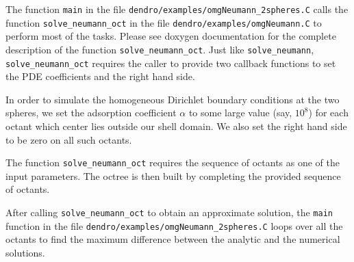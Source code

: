 \documentclass[12pt,reqno,a4paper]{report}
\numberwithin{equation}{section}
\begin{document}
The function \lstinline[basicstyle=\bfseries]'main' in the file \verb'dendro/examples/omgNeumann_2spheres.C' calls the function \lstinline[basicstyle=\bfseries]'solve_neumann_oct' in the file  \verb'dendro/examples/omgNeumann.C' to perform most of the tasks. Please see doxygen documentation for the complete description of the function \lstinline[basicstyle=\bfseries]'solve_neumann_oct'. 
Just like \lstinline[basicstyle=\bfseries]'solve_neumann', \lstinline[basicstyle=\bfseries]'solve_neumann_oct' requires the caller to provide two callback functions to set the  PDE coefficients and the right hand side. 

In order to simulate the homogeneous Dirichlet boundary conditions at the two spheres, we set the adsorption coefficient $\alpha$ to some large value (say, $10^8$) for each octant which center lies outside our shell domain. We also set the right hand side to be zero on all such octants.

The function \lstinline[basicstyle=\bfseries]'solve_neumann_oct' requires the sequence of octants as one of the input parameters. The octree is then built by completing the provided sequence of  octants.

After calling \lstinline[basicstyle=\bfseries]'solve_neumann_oct' to obtain an approximate solution, the \lstinline[basicstyle=\bfseries]'main' function in the file \verb'dendro/examples/omgNeumann_2spheres.C' loops over all the octants to find the maximum difference between the analytic and the numerical solutions.
\end{document}
